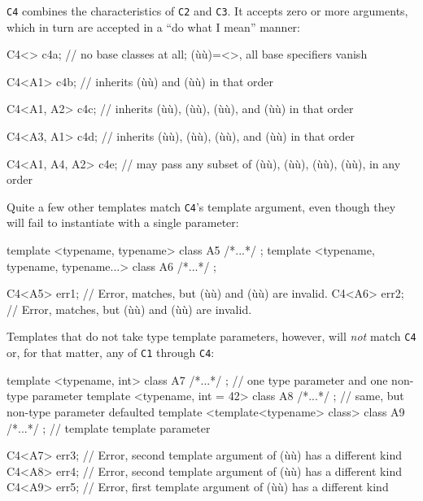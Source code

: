 \noindent \lstinline!C4! combines the characteristics of \lstinline!C2! and \lstinline!C3!.
It accepts zero or more arguments, which in turn are accepted in a ``do
what I mean'' manner:

\begin{emcppslisting}[emcppsbatch=e24]
C4<>           c4a;
    // no base classes at all; (ù{}ù)=<>, all base specifiers vanish

C4<A1>         c4b;
    // inherits (ù{}ù) and (ù{}ù) in that order

C4<A1, A2>     c4c;
    // inherits (ù{}ù), (ù{}ù), (ù{}ù), and (ù{}ù) in that order

C4<A3, A1>     c4d;
    // inherits (ù{}ù), (ù{}ù), (ù{}ù), and (ù{}ù) in that order

C4<A1, A4, A2> c4e;
    // may pass any subset of (ù{}ù), (ù{}ù), (ù{}ù), (ù{}ù), in any order
\end{emcppslisting}
    

\noindent Quite a few other templates match \lstinline!C4!'s template argument, even
though they will fail to instantiate with a single parameter:

\begin{emcppslisting}[emcppsbatch=e24]
template <typename, typename> class A5 { /*...*/ };
template <typename, typename, typename...> class A6 { /*...*/ };

C4<A5> err1;  // Error, matches, but (ù{}ù) and (ù{}ù) are invalid.
C4<A6> err2;  // Error, matches, but (ù{}ù) and (ù{}ù) are invalid.
\end{emcppslisting}
    

\noindent Templates that do not take type template parameters, however, will
\emph{not} match \lstinline!C4! or, for that matter, any of \lstinline!C1!
through \lstinline!C4!:

\begin{emcppslisting}[emcppsbatch=e24]
template <typename, int>
class A7 { /*...*/ };          // one type parameter and one non-type parameter
template <typename, int = 42>
class A8 { /*...*/ };          // same, but non-type parameter defaulted
template <template<typename> class>
class A9 { /*...*/ };          // template template parameter

C4<A7> err3;  // Error, second template argument of (ù{}ù) has a different kind
C4<A8> err4;  // Error, second template argument of (ù{}ù) has a different kind
C4<A9> err5;  // Error, first template argument of (ù{}ù) has a different kind
\end{emcppslisting}
    

